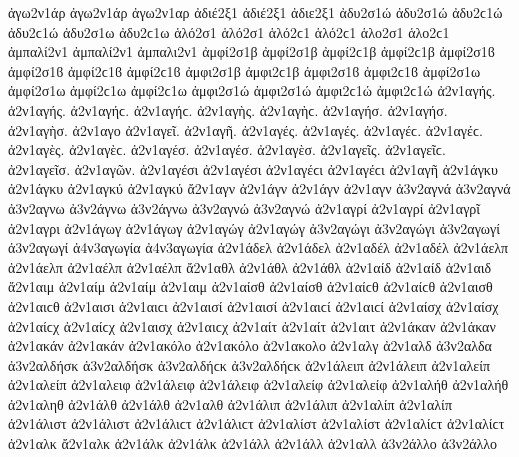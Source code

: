 {%
%
ἀγω2ν1άρ ἀγω2ν1άρ   %
ἀγω2ν1αρ
ἀδιέ2ξ1 ἀδιέ2ξ1   %
ἀδιε2ξ1
ἀδυ2σ1ώ ἀδυ2σ1ώ ἀδυ2ϲ1ώ ἀδυ2ϲ1ώ   %
ἀδυ2σ1ω ἀδυ2ϲ1ω
ἁλό2σ1 ἁλό2σ1 ἁλό2ϲ1 ἁλό2ϲ1   %
ἁλο2σ1 ἁλο2ϲ1
ἀμπαλί2ν1 ἀμπαλί2ν1   %
ἀμπαλι2ν1
ἀμφί2σ1β ἀμφί2σ1β ἀμφί2ϲ1β ἀμφί2ϲ1β ἀμφί2σ1ϐ ἀμφί2σ1ϐ ἀμφί2ϲ1ϐ ἀμφί2ϲ1ϐ %
ἀμφι2σ1β ἀμφι2ϲ1β ἀμφι2σ1ϐ ἀμφι2ϲ1ϐ
ἀμφί2σ1ω ἀμφί2σ1ω ἀμφί2ϲ1ω ἀμφί2ϲ1ω   %
ἀμφι2σ1ώ ἀμφι2σ1ώ ἀμφι2ϲ1ώ ἀμφι2ϲ1ώ
ἀ2ν1αγής. ἀ2ν1αγής. ἀ2ν1αγήϲ. ἀ2ν1αγήϲ.   %
ἀ2ν1αγὴς. ἀ2ν1αγὴϲ.
ἀ2ν1αγήσ. ἀ2ν1αγήσ.
ἀ2ν1αγὴσ.
ἀ2ν1αγο
ἀ2ν1αγεῖ.
ἀ2ν1αγῆ.
ἀ2ν1αγές. ἀ2ν1αγές. ἀ2ν1αγέϲ. ἀ2ν1αγέϲ.
ἀ2ν1αγὲς. ἀ2ν1αγὲϲ.
ἀ2ν1αγέσ. ἀ2ν1αγέσ.
ἀ2ν1αγὲσ.
ἀ2ν1αγεῖς. ἀ2ν1αγεῖϲ.
ἀ2ν1αγεῖσ.
ἀ2ν1αγῶν.
ἀ2ν1αγέσι ἀ2ν1αγέσι ἀ2ν1αγέϲι ἀ2ν1αγέϲι
ἀ2ν1αγῆ
ἀ2ν1άγκυ ἀ2ν1άγκυ   %
ἀ2ν1αγκύ ἀ2ν1αγκύ
ἄ2ν1αγν   %
ἀ2ν1άγν ἀ2ν1άγν
ἀ2ν1αγν   %
ἀ3ν2αγνά ἀ3ν2αγνά   %
ἀ3ν2αγνω   %
ἀ3ν2άγνω ἀ3ν2άγνω   %
ἀ3ν2αγνώ ἀ3ν2αγνώ
ἀ2ν1αγρί ἀ2ν1αγρί   %
ἀ2ν1αγρῖ   %
ἀ2ν1αγρι   %
ἀ2ν1άγωγ ἀ2ν1άγωγ   %
ἀ2ν1αγώγ ἀ2ν1αγώγ
ἀ3ν2αγώγι ἀ3ν2αγώγι   %
ἀ3ν2αγωγί ἀ3ν2αγωγί
ἀ4ν3αγωγία ἀ4ν3αγωγία   %
ἀ2ν1άδελ ἀ2ν1άδελ   %
ἀ2ν1αδέλ ἀ2ν1αδέλ
ἀ2ν1άελπ ἀ2ν1άελπ   %
ἀ2ν1αέλπ ἀ2ν1αέλπ
ἄ2ν1αθλ   %
ἀ2ν1άθλ ἀ2ν1άθλ
ἀ2ν1αίδ ἀ2ν1αίδ   %
ἀ2ν1αιδ   %
ἄ2ν1αιμ   %
ἀ2ν1αίμ ἀ2ν1αίμ
ἀ2ν1αιμ   %
ἀ2ν1αίσθ ἀ2ν1αίσθ ἀ2ν1αίϲθ ἀ2ν1αίϲθ   %
ἀ2ν1αισθ ἀ2ν1αιϲθ
ἀ2ν1αισι ἀ2ν1αιϲι   %
ἀ2ν1αισί ἀ2ν1αισί ἀ2ν1αιϲί ἀ2ν1αιϲί
ἀ2ν1αίσχ ἀ2ν1αίσχ ἀ2ν1αίϲχ ἀ2ν1αίϲχ   %
ἀ2ν1αισχ ἀ2ν1αιϲχ
ἀ2ν1αίτ ἀ2ν1αίτ   %
ἀ2ν1αιτ
ἀ2ν1άκαν ἀ2ν1άκαν   %
ἀ2ν1ακάν ἀ2ν1ακάν
ἀ2ν1ακόλο ἀ2ν1ακόλο   %
ἀ2ν1ακολο
ἀ2ν1αλγ   %
ἀ2ν1αλδ   %
ἀ3ν2αλδα   %
ἀ3ν2αλδήσκ ἀ3ν2αλδήσκ ἀ3ν2αλδήϲκ ἀ3ν2αλδήϲκ   %
ἀ2ν1άλειπ ἀ2ν1άλειπ   %
ἀ2ν1αλείπ ἀ2ν1αλείπ
ἀ2ν1αλειφ   %
ἀ2ν1άλειφ ἀ2ν1άλειφ   %
ἀ2ν1αλείφ ἀ2ν1αλείφ
ἀ2ν1αλήθ ἀ2ν1αλήθ   %
ἀ2ν1αληθ
ἀ2ν1άλθ ἀ2ν1άλθ   %
ἀ2ν1αλθ
ἀ2ν1άλιπ ἀ2ν1άλιπ   %
ἀ2ν1αλίπ ἀ2ν1αλίπ
ἀ2ν1άλιστ ἀ2ν1άλιστ ἀ2ν1άλιϲτ ἀ2ν1άλιϲτ   %
ἀ2ν1αλίστ ἀ2ν1αλίστ ἀ2ν1αλίϲτ ἀ2ν1αλίϲτ
ἀ2ν1αλκ   %
ἄ2ν1αλκ   %
ἀ2ν1άλκ ἀ2ν1άλκ
ἀ2ν1άλλ ἀ2ν1άλλ   %
ἀ2ν1αλλ
ἀ3ν2άλλο ἀ3ν2άλλο   %
}
